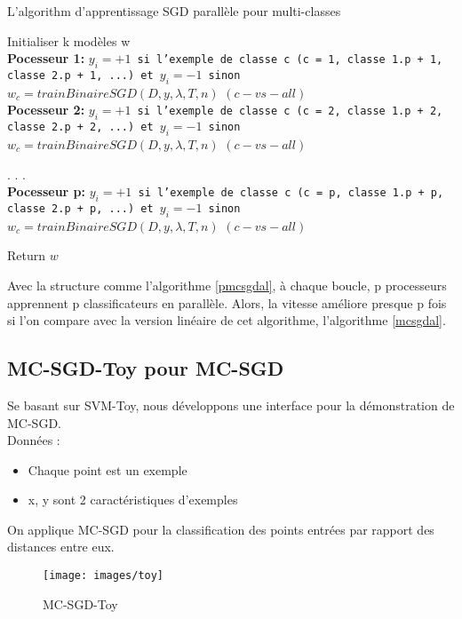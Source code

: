 \begin{algorithm}[H]
\caption{L'algorithm d'apprentissage SGD parallèle pour multi-classes}\label{pmcsgdal}
\begin{algorithmic}[1]

\State Initialiser k modèles w
\\
\BState \textbf{Pocesseur 1:}
\State \texttt{$y_i = +1$ si l'exemple de classe c (c = 1, classe 1.p + 1, classe 2.p + 1, ...) et $y_i = -1$ sinon}
\State \texttt{$w_c = trainBinaireSGD(D, y, \lambda, T, n)$} $(c-vs-all)$
\\
\BState \textbf{Pocesseur 2:}
\State \texttt{$y_i = +1$ si l'exemple de classe c (c = 2, classe 1.p + 2, classe 2.p + 2, ...) et $y_i = -1$ sinon}
\State \texttt{$w_c = trainBinaireSGD(D, y, \lambda, T, n)$} $(c-vs-all)$

\State .
\State .
\State .
\\
\BState \textbf{Pocesseur p:}
\State \texttt{$y_i = +1$ si l'exemple de classe c (c = p, classe 1.p + p, classe 2.p + p, ...) et $y_i = -1$ sinon}
\State \texttt{$w_c = trainBinaireSGD(D, y, \lambda, T, n)$} $(c-vs-all)$

\BState Return $w$

\EndProcedure
\end{algorithmic}
\end{algorithm}

Avec la structure comme l'algorithme \ref{pmcsgdal}, à chaque boucle, p processeurs apprennent p classificateurs en parallèle. Alors, la vitesse améliore presque p fois si l'on compare avec la version linéaire de cet algorithme, l'algorithme \ref{mcsgdal}.

\subsection{MC-SGD-Toy pour MC-SGD}
Se basant sur SVM-Toy\cite{cl01}, nous développons une interface pour la démonstration de MC-SGD.\\
Données :
\begin{itemize}
\item Chaque point est un exemple
\item x, y sont 2 caractéristiques d'exemples
\end{itemize}
On applique MC-SGD pour la classification des points entrées par rapport des distances entre eux.\\
\begin{figure}[H]
\centering
\texttt{[image: images/toy]}
\caption{MC-SGD-Toy}
\label{fig:toy}
\end{figure}

